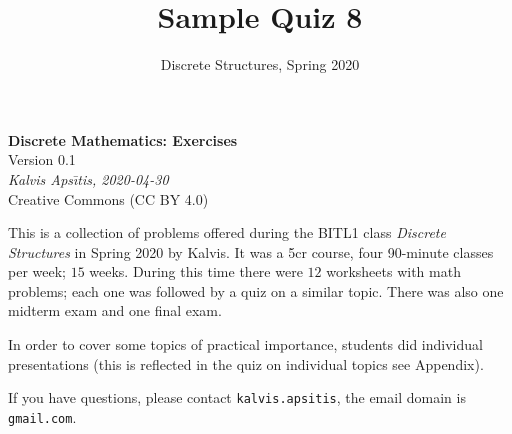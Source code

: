 \documentclass[jou]{apa6}
\title{Sample Quiz 8}
\author{Discrete Structures, Spring 2020}
\affiliation{RBS}
\begin{document}
\thispagestyle{empty}

\twocolumn
\begin{center}
{\large \bf Discrete Mathematics: Exercises}\\
{\large Version 0.1}\\
{\em Kalvis Aps\={\i}tis, 2020-04-30}\\
{\large Creative Commons (CC BY 4.0)}
\end{center}

{\footnotesize
This is a collection of problems 
offered during the BITL1 class {\em Discrete Structures} in Spring 2020 
by Kalvis. It was a 5cr course, four 90-minute classes per week;
$15$ weeks. During this time there were $12$ worksheets with math problems; 
each one was followed by a quiz on a similar topic. There was also one
midterm exam and one final exam. 

In order to cover some topics of practical importance, students did individual 
presentations (this is reflected in the quiz on individual topics \textendash{}
see Appendix).

If you have questions, please contact {\tt kalvis.apsitis}, the 
email domain is {\tt gmail.com}. 
}


\setcounter{tocdepth}{2}
\tableofcontents



\newpage


\newpage


\newpage


\newpage


\newpage


\newpage


\newpage


\newpage


\newpage


\newpage


\newpage



\newpage


\newpage




\newpage


\newpage




\newpage

\end{document}
